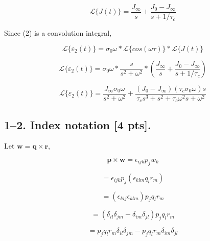 \documentclass[preprint,12pt,authoryear]{elsarticle}
\begin{document}
\begin{equation*}
    \mathcal{L}\{J(t)\} = \frac{J_\infty}{s} + \frac{J_0-J_\infty}{s+1/\tau_c}
\end{equation*}

\bigskip

Since (2) is a convolution integral,

\begin{equation*}
    \mathcal{L}\{\varepsilon_2(t)\} = \sigma_0\omega*\mathcal{L}\{cos(\omega\tau)\}*\mathcal{L}\{J(t)\}
\end{equation*}

\begin{equation*}
    \mathcal{L}\{\varepsilon_2(t)\} = \sigma_0\omega*\frac{s}{s^2+\omega^2}*(\frac{J_\infty}{s} + \frac{J_0-J_\infty}{s+1/\tau_c})
\end{equation*}

\begin{equation*}
    \mathcal{L}\{\varepsilon_2(t)\} = \frac{J_\infty\sigma_0\omega}{s^2+\omega^2} + \frac{(J_0-J_\infty)(\tau_c\sigma_0\omega)s}{\tau_c s^3+s^2+\tau_c\omega^2 s+\omega^2}
\end{equation*}

\newpage


\subsection*{1--2. \textbf{Index notation} [4 pts].}

Let $\bm{w}=\bm{q} \times \bm{r}$,

\begin{equation*}
    \bm{p} \times \bm{w} = \epsilon_{ijk} p_j w_k
\end{equation*}

\begin{equation*}
    = \epsilon_{ijk} p_j (\epsilon_{klm} q_l r_m)
\end{equation*}

\begin{equation*}
    = (\epsilon_{kij} \epsilon_{klm}) p_j q_l r_m
\end{equation*}

\begin{equation*}
    = (\delta_{il} \delta_{jm} - \delta_{im} \delta_{jl}) p_j q_l r_m
\end{equation*}

\begin{equation*}
    = p_j q_l r_m \delta_{il} \delta_{jm} - p_j q_l r_m \delta_{im} \delta_{jl}
\end{equation*}
\end{document}
